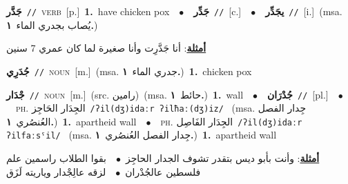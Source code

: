 \documentclass[10pt,a4paper,twoside]{article} %
\begin{document}
\begin{multicols}{2}
{\setlength\topsep{0pt}\textbf{\foreignlanguage{arabic}{جَدَّر}}\ {\color{gray}\texttt{//}\color{black}}\ \textsc{verb}\ [p.]\ \textbf{1.}~have chicken pox\ \ $\bullet$\ \ \setlength\topsep{0pt}\textbf{\foreignlanguage{arabic}{جَدِّر}}\ {\color{gray}\texttt{//}\color{black}}\ [c.]\ \ $\bullet$\ \ \setlength\topsep{0pt}\textbf{\foreignlanguage{arabic}{يجَدِّر}}\ {\color{gray}\texttt{//}\color{black}}\ [i.]\ \color{gray}(msa. \foreignlanguage{arabic}{يُصاب بجدري الماء}~\foreignlanguage{arabic}{\textbf{١.}})\color{black}\  \begin{flushright}\color{gray}\foreignlanguage{arabic}{\textbf{\underline{\foreignlanguage{arabic}{أمثلة}}}: أنا جَدَّرِت وأنا صغيرة لما كان عمري 7 سنين}\end{flushright}\color{black}} \vspace{2mm}

{\setlength\topsep{0pt}\textbf{\foreignlanguage{arabic}{جُدَرِي}}\ {\color{gray}\texttt{//}\color{black}}\ \textsc{noun}\ [m.]\ \color{gray}(msa. \foreignlanguage{arabic}{جدري الماء}~\foreignlanguage{arabic}{\textbf{١.}})\color{black}\ \textbf{1.}~chicken pox\ } \vspace{2mm}

{\setlength\topsep{0pt}\textbf{\foreignlanguage{arabic}{جْدَار}}\ {\color{gray}\texttt{//}\color{black}}\ \textsc{noun}\ [m.]\ (src. \color{gray}\foreignlanguage{arabic}{رامين}\color{black})\ \color{gray}(msa. \foreignlanguage{arabic}{حائط}~\foreignlanguage{arabic}{\textbf{١.}})\color{black}\ \textbf{1.}~wall\ \ $\bullet$\ \ \setlength\topsep{0pt}\textbf{\foreignlanguage{arabic}{جُدْرَان}}\ {\color{gray}\texttt{//}\color{black}}\ [pl.]\ \ $\bullet$\ \ \textsc{ph.} \color{gray} \foreignlanguage{arabic}{الجِدَار الحَاجِز}\color{black}\ {\color{gray}\texttt{/{\sffamily ʔil(dʒ)idaːr ʔilħaː(dʒ)iz}/}\color{black}}\ \color{gray} (msa. \foreignlanguage{arabic}{جِدار الفصل العُنصُري}~\foreignlanguage{arabic}{\textbf{١.}})\color{black}\ \textbf{1.}~apartheid wall\ \ $\bullet$\ \ \textsc{ph.} \color{gray} \foreignlanguage{arabic}{الجِدَار الفَاصِل}\color{black}\ {\color{gray}\texttt{/{\sffamily ʔil(dʒ)idaːr ʔilfaːsˤil}/}\color{black}}\ \color{gray} (msa. \foreignlanguage{arabic}{جِدار الفصل العُنصُري}~\foreignlanguage{arabic}{\textbf{١.}})\color{black}\ \textbf{1.}~apartheid wall\  \begin{flushright}\color{gray}\foreignlanguage{arabic}{\textbf{\underline{\foreignlanguage{arabic}{أمثلة}}}: وأنت بأبو ديس بتقدر تشوف الجدار الحاجِز\ $\bullet$\ \  بقوا الطلاب راسمين علم فلسطين عالجُدْران\ $\bullet$\ \  لزقه عالِجْدار وياريته لَزَق}\end{flushright}\color{black}} \vspace{2mm}


\end{multicols}
\end{document}
